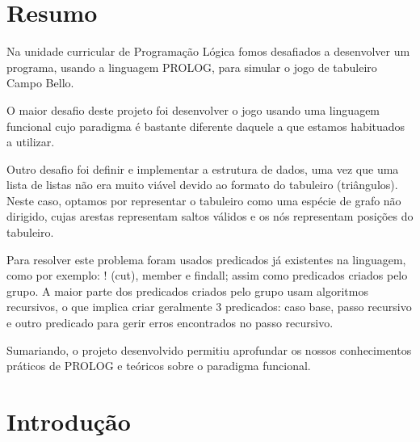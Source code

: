 \documentclass[a4paper]{article}
\begin{document}

\newpage

\section*{Resumo}
	Na unidade curricular de Programação Lógica fomos desafiados a desenvolver um programa, usando a linguagem PROLOG, para simular o jogo de tabuleiro Campo Bello.  

	O maior desafio deste projeto foi desenvolver o jogo usando uma linguagem funcional cujo paradigma é bastante diferente daquele a que estamos habituados a utilizar.

	Outro desafio foi definir e implementar a estrutura de dados, uma vez que uma lista de listas não era muito viável devido ao formato do tabuleiro (triângulos). Neste caso, optamos por representar o tabuleiro como uma espécie de grafo não dirigido, cujas arestas representam saltos válidos e os nós representam posições do tabuleiro.

	Para resolver este problema foram usados predicados já existentes na linguagem, como por exemplo: ! (cut),  member e findall; assim como predicados criados pelo grupo. A maior parte dos predicados criados pelo grupo usam algoritmos recursivos, o que implica criar geralmente 3 predicados: caso base, passo recursivo e outro predicado para gerir erros encontrados no passo recursivo.

	Sumariando, o projeto desenvolvido permitiu aprofundar os nossos conhecimentos práticos de PROLOG e teóricos sobre o paradigma funcional.

\newpage

\tableofcontents



\newpage

\section{Introdução}
\end{document}
